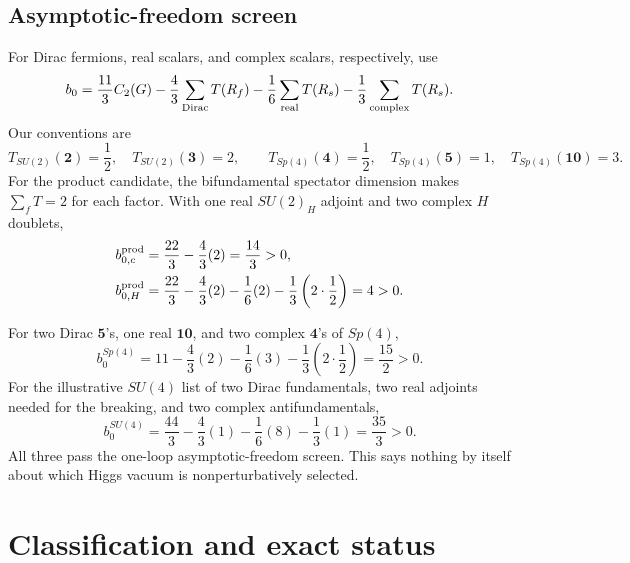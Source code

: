 \documentclass[11pt]{article}
\theoremstyle{definition}
\theoremstyle{remark}
\begin{document}
\subsection{Asymptotic-freedom screen}

For Dirac fermions, real scalars, and complex scalars, respectively, use
\begin{equation}
 b_0=\frac{11}{3}C_2(G)
 -\frac43\sum_{\rm Dirac}T(R_f)
 -\frac16\sum_{\rm real}T(R_s)
 -\frac13\sum_{\rm complex}T(R_s).
 \label{eq:beta-general}
\end{equation}
Our conventions are
\begin{equation}
 T_{SU(2)}(\bm2)=\frac12,\quad T_{SU(2)}(\bm3)=2,
 \qquad
 T_{Sp(4)}(\bm4)=\frac12,\quad T_{Sp(4)}(\bm5)=1,
 \quad T_{Sp(4)}(\bm{10})=3.
 \label{eq:indices}
\end{equation}
For the product candidate, the bifundamental spectator dimension makes
\(\sum_fT=2\) for each factor.  With one real \(SU(2)_H\) adjoint and two
complex \(H\) doublets,
\begin{align}
 b_{0,c}^{\rm prod}
 &=\frac{22}{3}-\frac43(2)=\frac{14}{3}>0,
 \label{eq:b0-product-c}\\
 b_{0,H}^{\rm prod}
 &=\frac{22}{3}-\frac43(2)-\frac16(2)
   -\frac13\left(2\cdot\frac12\right)=4>0.
 \label{eq:b0-product-h}
\end{align}

For two Dirac \(\bm5\)'s, one real \(\bm{10}\), and two complex
\(\bm4\)'s of \(Sp(4)\),
\begin{equation}
 b_0^{Sp(4)}
 =11-\frac43(2)-\frac16(3)
 -\frac13\left(2\cdot\frac12\right)
 =\frac{15}{2}>0.
 \label{eq:b0-sp4}
\end{equation}
For the illustrative \(SU(4)\) list of two Dirac fundamentals, two real
adjoints needed for the breaking, and two complex antifundamentals,
\begin{equation}
 b_0^{SU(4)}
 =\frac{44}{3}-\frac43(1)-\frac16(8)-\frac13(1)
 =\frac{35}{3}>0.
 \label{eq:b0-su4}
\end{equation}
All three pass the one-loop asymptotic-freedom screen.  This says nothing by
itself about which Higgs vacuum is nonperturbatively selected.

\section{Classification and exact status}
\end{document}

